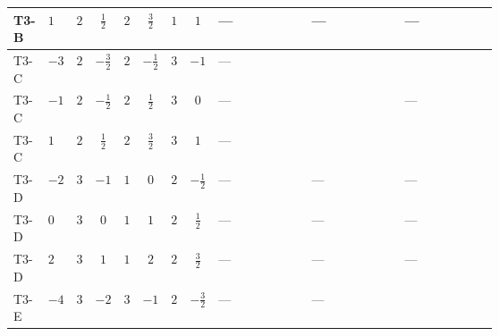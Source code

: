 \documentclass[8pt]{article}
\begin{document}
\begin{landscape}
\begin{longtable}{@{}llcccccc >{\raggedright\arraybackslash}p{0.21\linewidth} >{\raggedright\arraybackslash}p{0.21\linewidth} >{\raggedright\arraybackslash}p{0.21\linewidth}@{}}
\midrule
T3-B & $1$ & $2$ & $\frac{1}{2}$ & $2$ & $\frac{3}{2}$ & $1$ & $1$ & --- & --- & --- \\
\midrule
T3-C & $-3$ & $2$ & $-\frac{3}{2}$ & $2$ & $-\frac{1}{2}$ & $3$ & $-1$ & --- & \scriptsize\adjustbox{max width=\linewidth}{$\begin{gathered} \frac{3}{2} T_{\nu}^{(1)} \left({y_1}\right)_{ij}\end{gathered}$} & \scriptsize\adjustbox{max width=\linewidth}{$\begin{gathered} +\frac{1}{4} (3 \left({y_2}\,\left({y_2}\right)^{\dagger}\,{y_1}\right)_{ij}+2 \left({Y_e}\,\left({Y_e}\right)^{\dagger}\,{y_1}\right)_{ij}+5 \left({y_1}\,\left({y_1}\right)^{\dagger}\,{y_1}\right)_{ij})\end{gathered}$} \\
\midrule
T3-C & $-1$ & $2$ & $-\frac{1}{2}$ & $2$ & $\frac{1}{2}$ & $3$ & $0$ & --- & \scriptsize\adjustbox{max width=\linewidth}{$\begin{gathered} +\frac{3}{2} T_{\nu}^{(1)} \left({y_1}\right)_{ij}\end{gathered}$} & --- \\
\midrule
T3-C & $1$ & $2$ & $\frac{1}{2}$ & $2$ & $\frac{3}{2}$ & $3$ & $1$ & --- & \scriptsize\adjustbox{max width=\linewidth}{$\begin{gathered} \frac{3}{2} T_{\nu}^{(1)} \left({y_1}\right)_{ij}\end{gathered}$} & \scriptsize\adjustbox{max width=\linewidth}{$\begin{gathered} +\frac{1}{4} (3 \left({y_2}\,\left({y_2}\right)^{\dagger}\,{y_1}\right)_{ij}+2 \left({Y_e}\,\left({Y_e}\right)^{\dagger}\,{y_1}\right)_{ij}+5 \left({y_1}\,\left({y_1}\right)^{\dagger}\,{y_1}\right)_{ij})\end{gathered}$} \\
\midrule
T3-D & $-2$ & $3$ & $-1$ & $1$ & $0$ & $2$ & $-\frac{1}{2}$ & --- & --- & --- \\
\midrule
T3-D & $0$ & $3$ & $0$ & $1$ & $1$ & $2$ & $\frac{1}{2}$ & --- & --- & --- \\
\midrule
T3-D & $2$ & $3$ & $1$ & $1$ & $2$ & $2$ & $\frac{3}{2}$ & --- & --- & --- \\
\midrule
T3-E & $-4$ & $3$ & $-2$ & $3$ & $-1$ & $2$ & $-\frac{3}{2}$ & --- & --- & \scriptsize\adjustbox{max width=\linewidth}{$\begin{gathered} +\frac{1}{4} (3 \left({y_2}\,\left({y_2}\right)^{\dagger}\,{y_1}\right)_{ij}+2 \left({Y_e}\,\left({Y_e}\right)^{\dagger}\,{y_1}\right)_{ij}+6 \left({y_1}\,\left({y_1}\right)^{\dagger}\,{y_1}\right)_{ij})\end{gathered}$} \\

\end{longtable}
\end{landscape}
\end{document}

